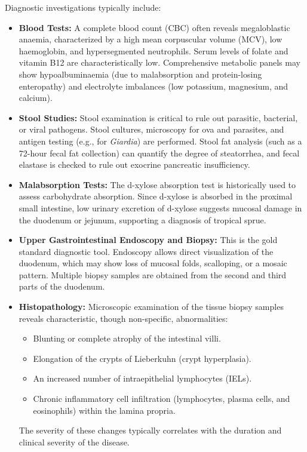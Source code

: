 Diagnostic investigations typically include:
\begin{itemize}
    \item \textbf{Blood Tests:} A complete blood count (CBC) often reveals megaloblastic anaemia, characterized by a high mean corpuscular volume (MCV), low haemoglobin, and hypersegmented neutrophils. Serum levels of folate and vitamin B12 are characteristically low. Comprehensive metabolic panels may show hypoalbuminaemia (due to malabsorption and protein-losing enteropathy) and electrolyte imbalances (low potassium, magnesium, and calcium).
    \item \textbf{Stool Studies:} Stool examination is critical to rule out parasitic, bacterial, or viral pathogens. Stool cultures, microscopy for ova and parasites, and antigen testing (e.g., for \textit{Giardia}) are performed. Stool fat analysis (such as a 72-hour fecal fat collection) can quantify the degree of steatorrhea, and fecal elastase is checked to rule out exocrine pancreatic insufficiency.
    \item \textbf{Malabsorption Tests:} The d-xylose absorption test is historically used to assess carbohydrate absorption. Since d-xylose is absorbed in the proximal small intestine, low urinary excretion of d-xylose suggests mucosal damage in the duodenum or jejunum, supporting a diagnosis of tropical sprue.
    \item \textbf{Upper Gastrointestinal Endoscopy and Biopsy:} This is the gold standard diagnostic tool. Endoscopy allows direct visualization of the duodenum, which may show loss of mucosal folds, scalloping, or a mosaic pattern. Multiple biopsy samples are obtained from the second and third parts of the duodenum.
    \item \textbf{Histopathology:} Microscopic examination of the tissue biopsy samples reveals characteristic, though non-specific, abnormalities:
        \begin{itemize}
            \item Blunting or complete atrophy of the intestinal villi.
            \item Elongation of the crypts of Lieberkuhn (crypt hyperplasia).
            \item An increased number of intraepithelial lymphocytes (IELs).
            \item Chronic inflammatory cell infiltration (lymphocytes, plasma cells, and eosinophils) within the lamina propria.
        \end{itemize}
        The severity of these changes typically correlates with the duration and clinical severity of the disease.
\end{itemize}

